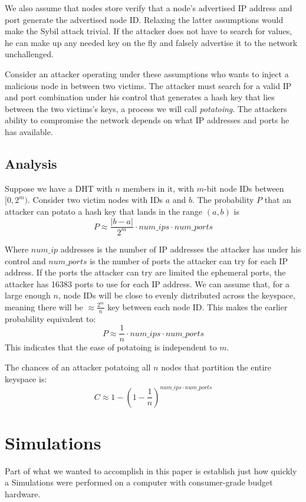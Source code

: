 \documentclass[10pt,a4paper]{article}
\begin{document}
We also assume that nodes store verify that a node's advertised IP address and port generate the advertised node ID. 
Relaxing the latter assumptions would  make the Sybil attack trivial. If the attacker does not have to search for values, he can make up any needed key on the fly and falsely advertise it to the network unchallenged.

Consider an attacker operating under these assumptions who wants to inject a malicious node in between two victims.
The attacker must search for a valid IP and port combination under his control that generates a hash key that lies between the two victims's keys, a process we will call \textit{potatoing}.
The attackers ability to compromise the network depends on what IP addresses and ports he has available.



\subsection{Analysis}
Suppose we have a DHT with $n$ members in it, with $m$-bit node IDs between $[0,2^{m})$. 
Consider two victim nodes with IDs $a$ and $b$.
The probability $P$ that an attacker can potato a hash key that lands in the range $(a,b)$ is 
$$ P \approx \frac{|b-a|}{2^{m}}\cdot num\_ips \cdot num\_ports  $$

Where $num\_ip$ addresses is the number of IP addresses the attacker has under his control and $num\_ports$ is the number of ports the attacker can try for each IP address.
If the ports the attacker can try are limited the ephemeral ports, the attacker has 16383 ports to use for each IP address.
We can assume that, for a large enough $n$, node IDs will be close to evenly distributed across the keyspace, meaning there will be $\approx \frac{2^{m}}{n}$ key between each node ID.
This makes the earlier probability equivalent to:
$$ P \approx \frac{1}{n}\cdot num\_ips \cdot num\_ports  $$
This indicates that the ease of potatoing is independent to $m$.

The chances of an attacker potatoing all $n$ nodes that partition the entire keyspace is:
$$C \approx  1 - (1 -\frac{1}{n})^{num\_ips \cdot num\_ports}  $$


\section{Simulations}
Part of what we wanted to accomplish in this paper is establish just how quickly a
Simulations were performed on a computer with consumer-grade budget hardware. 
\end{document}
